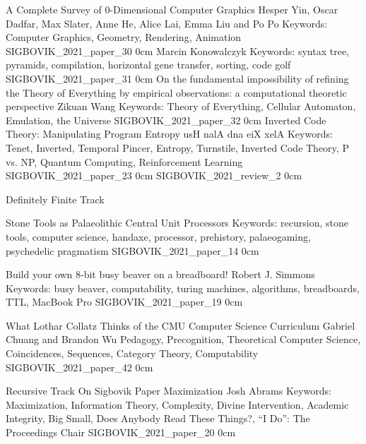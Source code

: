 \addpaper
    {A Complete Survey of 0-Dimensional Computer Graphics}
    {Hesper Yin, Oscar Dadfar, Max Slater, Anne He, Alice Lai, Emma Liu and Po Po}
    {Keywords: Computer Graphics, Geometry, Rendering, Animation}
    {SIGBOVIK_2021_paper_30}
    {0cm}
    {}
    {Marcin Konowalczyk}
    {Keywords: syntax tree, pyramids, compilation, horizontal gene transfer, sorting, code golf}
    {SIGBOVIK_2021_paper_31}
    {0cm}
    {}
\addpaper
    {On the fundamental impossibility of refining the Theory of Everything by empirical observations: a computational theoretic perspective}
    {Zikuan Wang}
    {Keywords: Theory of Everything, Cellular Automaton, Emulation, the Universe}
    {SIGBOVIK_2021_paper_32}
    {0cm}
    {}
\addpaper
    {Inverted Code Theory: Manipulating Program Entropy}
    {usH nalA dna eiX xelA}
    {Keywords: Tenet, Inverted, Temporal Pincer, Entropy, Turnstile, Inverted Code Theory, P vs. NP, Quantum Computing, Reinforcement Learning}
    {SIGBOVIK_2021_paper_23}
    {0cm}
    {}
\addreview
    {SIGBOVIK_2021_review_2}
    {0cm}



\addtrack
    {}{Definitely Finite Track}


\addpaper
    {Stone Tools as Palaeolithic Central Unit Processors}
    {}
    {Keywords: recursion, stone tools, computer science, handaxe, processor, prehistory, palaeogaming, psychedelic pragmatism}
    {SIGBOVIK_2021_paper_14}
    {0cm}
    {}

\addpaper
    {Build your own 8-bit busy beaver on a breadboard!}
    {Robert J. Simmons}
    {Keywords: busy beaver, computability, turing machines, algorithms, breadboards, TTL, MacBook Pro}
    {SIGBOVIK_2021_paper_19}
    {0cm}
    {}

\addpaper
    {What Lothar Collatz Thinks of the CMU Computer Science Curriculum}
    {Gabriel Chuang and Brandon Wu}
    {Pedagogy, Precognition, Theoretical Computer Science, Coincidences, Sequences, Category Theory, Computability}
    {SIGBOVIK_2021_paper_42}
    {0cm}
    {}

\addtrack
    {}{Recursive Track}
\addpaper
    {On Sigbovik Paper Maximization}
    {Josh Abrams}
    {Keywords: Maximization, Information Theory, Complexity, Divine Intervention, Academic Integrity, Big Small, Does Anybody Read These Things?, ``I Do'': The Proceedings Chair}
    {SIGBOVIK_2021_paper_20}
    {0cm}
    {}

